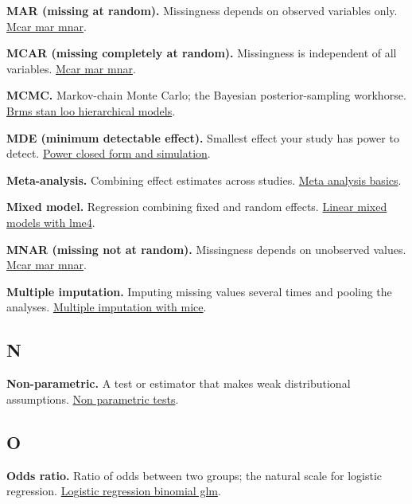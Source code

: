 \documentclass[
]{article}
\begin{document}
\textbf{MAR (missing at random).} Missingness depends on observed
variables only.
\href{../chapters/16-design/labs/lab-mcar-mar-mnar.Rmd}{Mcar mar mnar}.

\textbf{MCAR (missing completely at random).} Missingness is independent
of all variables.
\href{../chapters/16-design/labs/lab-mcar-mar-mnar.Rmd}{Mcar mar mnar}.

\textbf{MCMC.} Markov-chain Monte Carlo; the Bayesian posterior-sampling
workhorse.
\href{../chapters/10-bayesian/labs/lab-brms-stan-loo-hierarchical-models.Rmd}{Brms
stan loo hierarchical models}.

\textbf{MDE (minimum detectable effect).} Smallest effect your study has
power to detect.
\href{../chapters/05-power/labs/lab-power-closed-form-and-simulation.Rmd}{Power
closed form and simulation}.

\textbf{Meta-analysis.} Combining effect estimates across studies.
\href{../chapters/15-metaanalysis/labs/lab-meta-analysis-basics.Rmd}{Meta
analysis basics}.

\textbf{Mixed model.} Regression combining fixed and random effects.
\href{../chapters/16-design/labs/lab-linear-mixed-models-with-lme4.Rmd}{Linear
mixed models with lme4}.

\textbf{MNAR (missing not at random).} Missingness depends on unobserved
values. \href{../chapters/16-design/labs/lab-mcar-mar-mnar.Rmd}{Mcar mar
mnar}.

\textbf{Multiple imputation.} Imputing missing values several times and
pooling the analyses.
\href{../chapters/16-design/labs/lab-multiple-imputation-with-mice.Rmd}{Multiple
imputation with mice}.

\subsection{N}\label{n}

\textbf{Non-parametric.} A test or estimator that makes weak
distributional assumptions.
\href{../chapters/04-inferential/labs/lab-non-parametric-tests.Rmd}{Non
parametric tests}.

\subsection{O}\label{o}

\textbf{Odds ratio.} Ratio of odds between two groups; the natural scale
for logistic regression.
\href{../chapters/07-regression/labs/lab-logistic-regression-binomial-glm.Rmd}{Logistic
regression binomial glm}.
\end{document}
